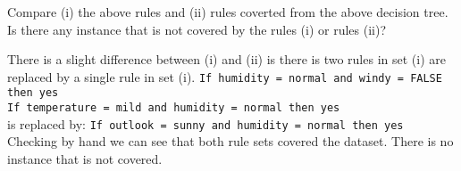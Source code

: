 \documentclass[12pt,twoside]{article}
\begin{document}
\begin{exercises}
\begin{exerciseparts}
\exercisepart
Compare (i) the above rules and (ii) rules coverted from the above
decision tree. Is there any instance that is not covered by the 
rules (i) or rules (ii)?

\ifsolution \solution{}
There is a slight difference between (i) and (ii) is there is
two rules in set (i) are replaced by a single rule in set (i).
\texttt{If humidity = normal and windy = FALSE then yes} \\
\texttt{If temperature = mild and humidity = normal then yes} \\
is replaced by:
\texttt{If outlook = sunny and humidity = normal then yes} \\

Checking by hand we can see that both rule sets covered the
dataset. There is no instance that is not covered.
\fi
\end{exerciseparts}
\end{exercises}
\end{document}
